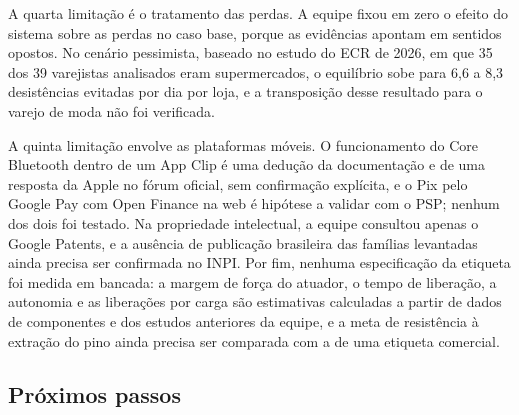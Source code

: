 A quarta limitação é o tratamento das perdas. A equipe fixou em zero o efeito do sistema sobre as perdas no caso base, porque as evidências apontam em sentidos opostos. No cenário pessimista, baseado no estudo do ECR de 2026, em que 35 dos 39 varejistas analisados eram supermercados, o equilíbrio sobe para 6,6 a 8,3 desistências evitadas por dia por loja, e a transposição desse resultado para o varejo de moda não foi verificada.

A quinta limitação envolve as plataformas móveis. O funcionamento do Core Bluetooth dentro de um App Clip é uma dedução da documentação e de uma resposta da Apple no fórum oficial, sem confirmação explícita, e o Pix pelo Google Pay com Open Finance na web é hipótese a validar com o PSP; nenhum dos dois foi testado. Na propriedade intelectual, a equipe consultou apenas o Google Patents, e a ausência de publicação brasileira das famílias levantadas ainda precisa ser confirmada no INPI. Por fim, nenhuma especificação da etiqueta foi medida em bancada: a margem de força do atuador, o tempo de liberação, a autonomia e as liberações por carga são estimativas calculadas a partir de dados de componentes e dos estudos anteriores da equipe, e a meta de resistência à extração do pino ainda precisa ser comparada com a de uma etiqueta comercial.

\subsection{Próximos passos}

